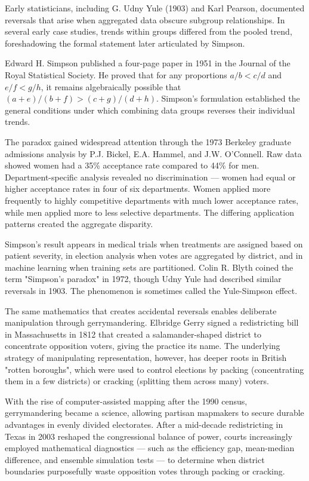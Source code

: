 \begin{historical}
Early statisticians, including G. Udny Yule (1903) and Karl Pearson, documented reversals that arise when aggregated data obscure subgroup relationships. In several early case studies, trends within groups differed from the pooled trend, foreshadowing the formal statement later articulated by Simpson.

Edward H. Simpson published a four-page paper in 1951 in the Journal of the Royal Statistical Society. He proved that for any proportions $a/b < c/d$ and $e/f < g/h$, it remains algebraically possible that $(a+e)/(b+f) > (c+g)/(d+h)$. Simpson's formulation established the general conditions under which combining data groups reverses their individual trends.

The paradox gained widespread attention through the 1973 Berkeley graduate admissions analysis by P.J. Bickel, E.A. Hammel, and J.W. O'Connell. Raw data showed women had a 35\% acceptance rate compared to 44\% for men. Department-specific analysis revealed no discrimination — women had equal or higher acceptance rates in four of six departments. Women applied more frequently to highly competitive departments with much lower acceptance rates, while men applied more to less selective departments. The differing application patterns created the aggregate disparity.

Simpson's result appears in medical trials when treatments are assigned based on patient severity, in election analysis when votes are aggregated by district, and in machine learning when training sets are partitioned. Colin R. Blyth coined the term "Simpson's paradox" in 1972, though Udny Yule had described similar reversals in 1903. The phenomenon is sometimes called the Yule-Simpson effect.

The same mathematics that creates accidental reversals enables deliberate manipulation through gerrymandering. Elbridge Gerry signed a redistricting bill in Massachusetts in 1812 that created a salamander-shaped district to concentrate opposition voters, giving the practice its name. The underlying strategy of manipulating representation, however, has deeper roots in British "rotten boroughs", which were used to control elections by packing (concentrating them in a few districts) or cracking (splitting them across many) voters.

With the rise of computer-assisted mapping after the 1990 census, gerrymandering became a science, allowing partisan mapmakers to secure durable advantages in evenly divided electorates. After a mid-decade redistricting in Texas in 2003 reshaped the congressional balance of power, courts increasingly employed mathematical diagnostics — such as the efficiency gap, mean-median difference, and ensemble simulation tests — to determine when district boundaries purposefully waste opposition votes through packing or cracking. 
\end{historical}
